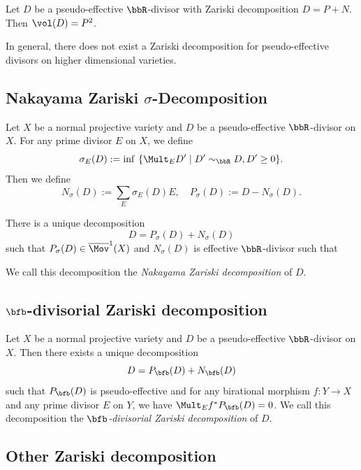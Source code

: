   \begin{corollary}
    Let $D$ be a pseudo-effective $\bbR$-divisor with Zariski decomposition $D = P + N$.
    Then $\vol(D) = P^2$.
   \Yang{}
  \end{corollary}


  \begin{remark}
    In general, there does not exist a Zariski decomposition for pseudo-effective divisors on higher dimensional varieties.
   \Yang{}
  \end{remark}

  \begin{example}
    \Yang{}
  \end{example}


\subsection[Nakayama Zariski Decomposition]{Nakayama Zariski $\sigma$-Decomposition}

  Let $X$ be a normal projective variety and $D$ be a pseudo-effective $\bbR$-divisor on $X$. For any prime divisor $E$ on $X$, we define
  \[ \sigma_E(D) := \inf\ \{ \Mult_E D' \mid D' \sim_\bbR D, D' \geq 0 \}. \]
  Then we define
  \[ N_\sigma(D) := \sum_E \sigma_E(D) E, \quad P_\sigma(D) := D - N_\sigma(D). \]


  \begin{theorem}
    There is a unique decomposition
    \[ D = P_\sigma(D) + N_\sigma(D) \]
    such that $P_\sigma(D) \in \overline{\Mov}^1(X)$ and $N_\sigma(D)$ is effective $\bbR$-divisor such that \Yang{}
    
    We call this decomposition the \emph{Nakayama Zariski decomposition} of $D$.

    \Yang{}
  \end{theorem}



\subsection[b-divisorial Zariski decomposition]{$\bfb$-divisorial Zariski decomposition}

  \begin{theorem}[{ref.}]
    Let $X$ be a normal projective variety and $D$ be a pseudo-effective $\bbR$-divisor on $X$. Then there exists a unique decomposition
    \[ D = P_\bfb(D) + N_\bfb(D) \]
    such that $P_\bfb(D)$ is pseudo-effective and for any birational morphism $f: Y \to X$ and any prime divisor $E$ on $Y$, we have $\Mult_E f^* P_\bfb(D) = 0$. We call this decomposition the \emph{$\bfb$-divisorial Zariski decomposition} of $D$.
    \Yang{}
  \end{theorem}



\subsection{Other Zariski decomposition}



